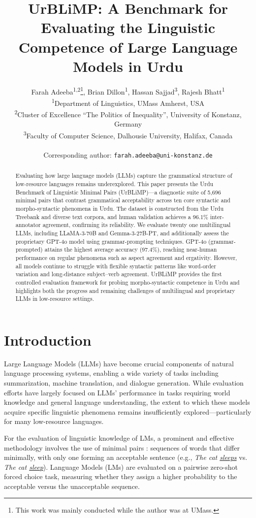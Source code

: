 \documentclass[11pt]{article}
\title{UrBLiMP:  A Benchmark for Evaluating the Linguistic Competence of Large Language Models in Urdu}
\author{
Farah Adeeba\textsuperscript{1,2}\thanks{This work was mainly conducted while the author was at UMass.},
Brian Dillon\textsuperscript{1},
Hassan Sajjad\textsuperscript{3}, Rajesh Bhatt\textsuperscript{1}
\\
\textsuperscript{1}Department of Linguistics, UMass Amherst, USA \\
\textsuperscript{2}Cluster of Excellence “The Politics of Inequality”, University of Konstanz, Germany\\
\textsuperscript{3}Faculty of Computer Science, Dalhousie University, Halifax, Canada \\
\\
Corresponding author: \texttt{farah.adeeba@uni-konstanz.de}\\
}
\begin{document}
\maketitle


\begin{abstract}
Evaluating how large language models (LLMs) capture the grammatical structure of low-resource languages remains underexplored. This paper presents the Urdu Benchmark of Linguistic Minimal Pairs (UrBLiMP)—a diagnostic suite of 5,696 minimal pairs that contrast grammatical acceptability across ten core syntactic and morpho-syntactic phenomena in Urdu. The dataset is constructed from the Urdu Treebank and diverse text corpora, and human validation achieves a 96.1\% inter-annotator agreement, confirming its reliability. We evaluate twenty one multilingual LLMs, including LLaMA-3-70B and Gemma-3-27B-PT, and additionally assess the proprietary GPT-4o model using grammar-prompting techniques. GPT-4o (grammar-prompted) attains the highest average accuracy (97.4\%), reaching near-human performance on regular phenomena such as aspect agreement and ergativity. However, all models continue to struggle with flexible syntactic patterns like word-order variation and long-distance subject–verb agreement. UrBLiMP provides the first controlled evaluation framework for probing morpho-syntactic competence in Urdu and highlights both the progress and remaining challenges of multilingual and proprietary LLMs in low-resource settings.
\end{abstract}

\section{Introduction}

 Large Language Models (LLMs) have become crucial components of natural language processing systems, enabling a wide variety of tasks including summarization, machine translation, and dialogue generation. While evaluation efforts have largely focused on LLMs' performance in tasks requiring world knowledge and general language understanding, the extent to which these models acquire specific linguistic phenomena remains insufficiently explored—particularly for many low-resource languages.
 
 For the evaluation of linguistic knowledge of LMs, a prominent and effective methodology involves the use of minimal pairs \cite{blimp} : sequences of words that differ minimally, with only one forming an acceptable sentence (e.g., \textit{The cat \underline{sleeps}} vs. \textit{The cat \underline{sleep}}). Language Models (LMs) are evaluated on a pairwise zero-shot forced choice task, measuring whether they assign a higher probability to the acceptable versus the unacceptable sequence. 
\end{document}
